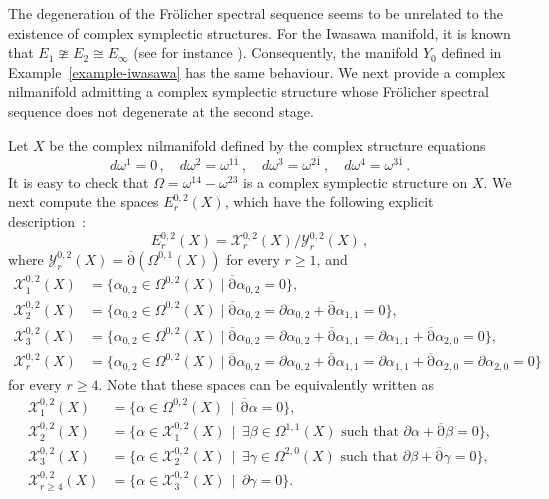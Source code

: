 \documentclass[a4paper]{amsart}
\theoremstyle{definition}
\theoremstyle{remark}
\newcommand{\db}{\operatorname{\overline{\partial}}}
\numberwithin{equation}{section}
\begin{document}
The degeneration of the Fr\"olicher spectral sequence seems to be unrelated to the 
existence of complex symplectic structures. For the Iwasawa manifold, 
it is known that $E_1\ncong E_2\cong E_{\infty}$ (see for instance \cite{ceballos-otal-ugarte-villacampa}). Consequently, the manifold $Y_0$ defined in Example~\ref{example-iwasawa} has the same behaviour. We next provide a complex nilmanifold admitting a complex symplectic structure whose Fr\"olicher spectral sequence does not degenerate at the second stage.

\smallskip
Let $X$ be the complex nilmanifold defined by the complex structure equations
\[
d\omega^1=0\,,\quad d\omega^2=\omega^{1\bar1}\,,\quad d\omega^3=\omega^{2\bar1}\,,\quad
d\omega^4=\omega^{3\bar1}\,.
\]
It is easy to check that $\Omega=\omega^{14}-\omega^{23}$ is a complex symplectic structure on $X$. We next compute the spaces $E^{0,2}_r(X)$, which have the following explicit description~\cite[Theorem 1, Corollary 6]{cordero-fernandez-gray-ugarte}:
\[
E^{0,2}_r(X)={\mathcal X}^{0,2}_r(X)/{\mathcal Y}^{0,2}_r(X)\,,
\]
where ${\mathcal Y}^{0,2}_r(X)=\db(\Omega^{0,1}(X))$ for every $r\geq 1$, and
\begin{equation*}
\begin{split}
{\mathcal X}^{0,2}_1(X)&= \{\alpha_{0,2} \in \Omega^{0,2}(X) \mid \db\alpha_{0,2}=0\},\\ 
{\mathcal X}^{0,2}_2(X)&= \{\alpha_{0,2} \in \Omega^{0,2}(X) \mid \db\alpha_{0,2}=\partial\alpha_{0,2}+\db\alpha_{1,1}=0\},\\
{\mathcal X}^{0,2}_3(X) &= \{\alpha_{0,2} \in \Omega^{0,2}(X) \mid \db\alpha_{0,2}=\partial\alpha_{0,2}+\db\alpha_{1,1}=\partial\alpha_{1,1}+\db\alpha_{2,0}=0\},\\
{\mathcal X}^{0,2}_r(X)&= \{\alpha_{0,2} \in \Omega^{0,2}(X) \mid \db\alpha_{0,2}=\partial\alpha_{0,2}+\db\alpha_{1,1}=\partial\alpha_{1,1}+\db\alpha_{2,0}=\partial\alpha_{2,0}=0\}
\end{split}
\end{equation*}
for every $r\geq 4$. Note that these spaces can be equivalently written as
\begin{equation*}
\begin{split}
{\mathcal X}^{0,2}_1(X)&= \{\alpha \in \Omega^{0,2}(X) \, \mid\,  \db\alpha=0 \},\\ 
{\mathcal X}^{0,2}_2(X)&= \{\alpha \in \mathcal{X}^{0,2}_1(X) \, \mid\,  
	\exists\beta\in\Omega^{1,1}(X) \text{ such that } \partial\alpha+\db\beta=0\},\\
{\mathcal X}^{0,2}_3(X) &= \{\alpha \in {\mathcal X}^{0,2}_2(X) \, \mid\,  
	\exists\gamma\in\Omega^{2,0}(X) \text{ such that } \partial\beta+\db\gamma=0\},\\
{\mathcal X}^{0,2}_{r\geq 4}(X)&= \{\alpha \in {\mathcal X}^{0,2}_3(X) \, \mid\,  
	\partial\gamma=0\}.
\end{split}
\end{equation*}
\end{document}

